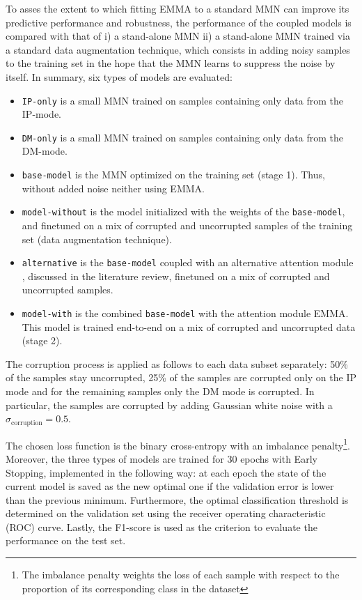 To asses the extent to which fitting EMMA to a standard MMN can improve its predictive performance and robustness, the performance of the coupled models is compared with that of i) a stand-alone MMN ii) a stand-alone MMN trained via a standard data augmentation technique, which consists in adding noisy samples to the training set in the hope that the MMN learns to suppress the noise by itself. In summary, six types of models are evaluated:
\begin{itemize}
\item \texttt{IP-only} is a small MMN trained on samples containing only data from the IP-mode.
\item \texttt{DM-only} is a small MMN trained on samples containing only data from the DM-mode.
\item \texttt{base-model} is the MMN optimized on the training set (stage 1). Thus, without added noise neither using EMMA.
\item \texttt{model-without} is the model initialized with the weights of the \texttt{base-model}, and finetuned on a mix of corrupted and uncorrupted samples of the training set (data augmentation technique).
\item \texttt{alternative} is the \texttt{base-model} coupled with an alternative attention module \citep{audiovisual-attention}, discussed in the literature review, finetuned on a mix of corrupted and uncorrupted samples.
\item \texttt{model-with} is the combined \texttt{base-model} with the attention module EMMA. This model is trained end-to-end on a mix of corrupted and uncorrupted data (stage 2). 
\end{itemize}
The corruption process is applied as follows to each data subset separately: 50\% of the samples stay uncorrupted, 25\% of the samples are corrupted only on the IP mode and for the remaining samples only the DM mode is corrupted. In particular, the samples are corrupted by adding Gaussian white noise with a $\sigma_{\text{corruption}} = 0.5$.

The chosen loss function is the binary cross-entropy with an imbalance penalty\footnote{The imbalance penalty weights the loss of each sample with respect to the proportion of its corresponding class in the dataset}. Moreover, the three types of models are trained for 30 epochs with Early Stopping, implemented in the following way: at each epoch the state of the current model is saved as the new optimal one if the validation  error is lower than the previous minimum. Furthermore, the optimal classification threshold is determined on the validation set using the receiver operating characteristic (ROC) curve. Lastly, the F1-score is used as the criterion to evaluate the performance on the test set. 

